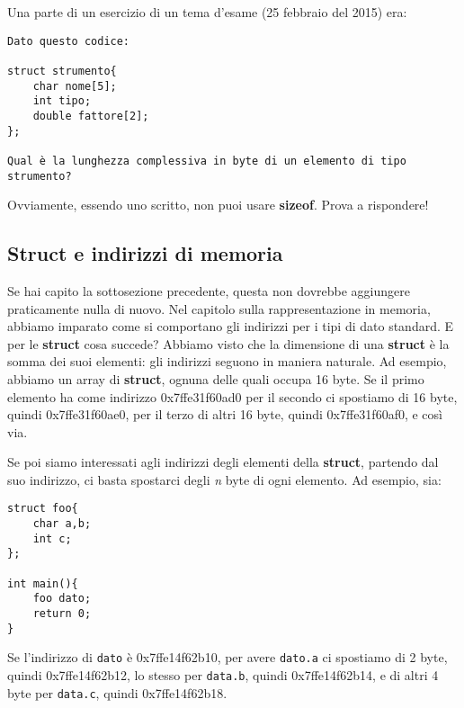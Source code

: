 Una parte di un esercizio di un tema d'esame (25 febbraio del 2015) era:
\begin{shaded}
	\begin{verbatim}
Dato questo codice:

struct strumento{
    char nome[5];
    int tipo;
    double fattore[2];
};

Qual è la lunghezza complessiva in byte di un elemento di tipo strumento?
\end{verbatim}

\end{shaded}

Ovviamente, essendo uno scritto, non puoi usare \textbf{sizeof}. Prova a rispondere!
\subsection{Struct e indirizzi di memoria}
Se hai capito la sottosezione precedente, questa non dovrebbe aggiungere praticamente nulla di nuovo. Nel capitolo sulla rappresentazione in memoria, abbiamo imparato come si comportano gli indirizzi per i tipi di dato standard. E per le \textbf{struct} cosa succede? Abbiamo visto che la dimensione di una \textbf{struct} è la somma dei suoi elementi: gli indirizzi seguono in maniera naturale. Ad esempio, abbiamo un array di \textbf{struct}, ognuna delle quali occupa 16 byte.  Se il primo elemento ha come indirizzo  0x7ffe31f60ad0 per il secondo ci spostiamo di 16 byte, quindi 0x7ffe31f60ae0, per il terzo di altri 16 byte, quindi 0x7ffe31f60af0, e così via. 

Se poi siamo interessati agli indirizzi degli elementi della \textbf{struct}, partendo dal suo indirizzo, ci basta spostarci degli \emph{n} byte di ogni elemento. Ad esempio, sia:
\begin{lstlisting}
struct foo{
	char a,b;
	int c;
};

int main(){
	foo dato;
	return 0;
}
\end{lstlisting}
Se l'indirizzo di \verb|dato| è 0x7ffe14f62b10, per avere \verb|dato.a| ci spostiamo di 2 byte, quindi 0x7ffe14f62b12, lo stesso per \verb|data.b|, quindi 0x7ffe14f62b14, e di altri 4 byte per \verb|data.c|, quindi 0x7ffe14f62b18.\\


